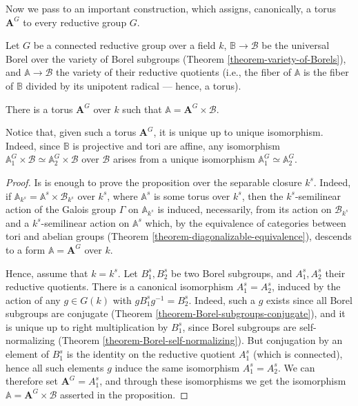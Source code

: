 Now we pass to an important construction, which assigns, canonically, a torus $\mathbf A^G$ to every reductive group $G$. 

\begin{proposition}
 \label{proposition-universal-Cartan}
Let $G$ be a connected reductive group over a field $k$, $\mathbb B\to \mathcal B$ be the universal Borel over the variety of Borel subgroups (Theorem \ref{theorem-variety-of-Borels}), and $\mathbb A\to \mathcal B$ the variety of their reductive quotients (i.e., the fiber of $\mathbb A$ is the fiber of $\mathbb B$ divided by its unipotent radical --- hence, a torus). 

There is a torus $\mathbf A^G$ over $k$ such that $\mathbb A = \mathbf A^G\times \mathcal B $.
\end{proposition}

Notice that, given such a torus $\mathbf A^G$, it is unique up to unique isomorphism. Indeed, since $\mathbb B$ is projective and tori are affine, any isomorphism $\mathbb A_1^G \times \mathcal B \simeq \mathbb A_2^G \times \mathcal B$ over $\mathcal B$ arises from a unique isomorphism $\mathbb A_1^G \simeq \mathbb A_2^G$.

\begin{proof}
Is is enough to prove the proposition over the separable closure $k^s$. Indeed, if $\mathbb A_{k^s} = \mathbb A^s\times \mathcal B_{k^s} $ over $k^s$, where $\mathbb A^s$ is some torus over $k^s$, then the $k^s$-semilinear action of the Galois group $\Gamma$ on $\mathbb A_{k^s}$ is induced, necessarily, from its action on $\mathcal B_{k^s} $  and a $k^s$-semilinear action on $\mathbb A^s$ which, by the equivalence of categories between tori and abelian groups (Theorem \ref{theorem-diagonalizable-equivalence}), descends to a form $\mathbb A = \mathbf A^G$ over $k$.

Hence, assume that $k=k^s$. Let $B^s_1, B^s_2$ be two Borel subgroups, and $A_1^s, A_2^s$ their reductive quotients. There is a canonical isomorphism $A_1^s=A_2^s$, induced by the action of any $g\in G(k)$ with $g B^s_1 g^{-1} = B^s_2$. Indeed, such a $g$ exists since all Borel subgroups are conjugate (Theorem \ref{theorem-Borel-subgroups-conjugate}), and it is unique up to right multiplication by $B^s_1$, since Borel subgroups are self-normalizing (Theorem \ref{theorem-Borel-self-normalizing}). But conjugation by an element of $B^s_1$ is the identity on the reductive quotient $A^s_1$ (which is connected), hence all such elements $g$ induce the same isomorphism $A_1^s=A_2^s$. We can therefore set $\mathbf A^G = A_1^s$, and through these isomorphisms we get the isomorphism $\mathbb A = \mathbf A^G\times \mathcal B $ asserted in the proposition.
\end{proof}

